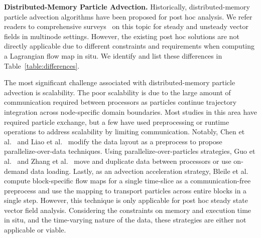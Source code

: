 \textbf{Distributed-Memory Particle Advection.}
%
Historically, distributed-memory particle advection algorithms have been proposed for post hoc analysis.
%
We refer readers to comprehensive surveys~\cite{PeterkaRNLSKH11,zhang2018survey} on this topic for steady and unsteady vector fields in multinode settings.
%
However, the existing post hoc solutions are not directly applicable due to different constraints and requirements when computing a Lagrangian flow map in situ.
%
We identify and list these differences in Table~\ref{table:differences}.

The most significant challenge associated with distributed-memory particle advection is scalability.
%
The poor scalability is due to the large amount of communication required between processors as particles continue trajectory integration across node-specific domain boundaries.
%
Most studies in this area have required particle exchange, but a few have used preprocessing or runtime operations to address scalability by limiting communication.
%
Notably, Chen et al.~\cite{ChenXLS12, ChenS13} and Liao et al.~\cite{Liao2019ScalablePF} modify the data layout as a preprocess to propose parallelize-over-data techniques.
%
%
Using parallelize-over-particles strategies, Guo et al.~\cite{GuoHSZHY14} and Zhang et al.~\cite{ZhangGY16} move and duplicate data between processors or use on-demand data loading.
%
Lastly, as an advection acceleration strategy, Bleile et al.~\cite{bleile2017accelerating} compute block-specific flow maps for a single time-slice as a communication-free preprocess and use the mapping to transport particles across entire blocks in a single step. 
%
However, this technique is only applicable for post hoc steady state vector field analysis.
%
Considering the constraints on memory and execution time in situ, and the time-varying nature of the data, these strategies are either not applicable or viable. 
%
%

